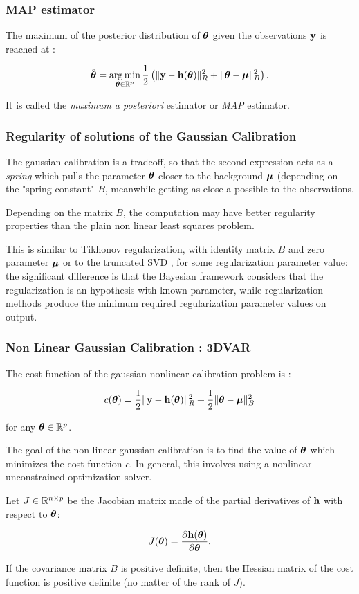 \documentclass{beamer}
\begin{document}
\begin{frame}
\frametitle{MAP estimator}

The maximum of the posterior distribution of $\boldsymbol{\theta}$ given
the observations ${\bf y}$ is reached at :

$$
   \hat{\boldsymbol{\theta}} = \operatorname*{arg\,min}_{\boldsymbol{\theta}\in\mathbb{R}^p} \frac{1}{2} \left( \|{\bf y} - {\bf h}(\boldsymbol{\theta})\|^2_R 
   + \|\boldsymbol{\theta}-\boldsymbol{\mu} \|^2_B \right).
$$

It is called the \emph{maximum a posteriori} estimator or \emph{MAP}
estimator.
\end{frame}

\begin{frame}
\frametitle{Regularity of solutions of the Gaussian Calibration}

The gaussian calibration is a tradeoff, so that the second expression
acts as a \emph{spring} which pulls the parameter $\boldsymbol{\theta}$
closer to the background $\boldsymbol{\mu}$ (depending on the "spring
constant" $B$, meanwhile getting as close a possible to the
observations. 

Depending on the matrix $B$, the computation may
have better regularity properties than the plain non linear least
squares problem.

This is similar to Tikhonov regularization, with identity 
matrix $B$ and zero parameter $\boldsymbol{\mu}$ \cite{mueller2012linear} or to 
the truncated SVD \cite{Hansen00thelcurve}, for some 
regularization parameter value: the significant difference is that the 
Bayesian framework considers that the regularization is an hypothesis with 
known parameter, while regularization methods produce the minimum 
required regularization parameter values on output. 
\end{frame}

\begin{frame}
\frametitle{Non Linear Gaussian Calibration : 3DVAR}

The cost function of the gaussian nonlinear calibration problem is :

$$
c(\boldsymbol{\theta}) = \frac{1}{2}\|{\bf y}-{\bf h}(\boldsymbol{\theta})\|^2_R 
   + \frac{1}{2}\|\boldsymbol{\theta}-\boldsymbol{\mu} \|^2_B
$$

for any $\boldsymbol{\theta}\in\mathbb{R}^p$.

The goal of the non linear gaussian calibration is to find the value of
$\boldsymbol{\theta}$ which minimizes the cost function $c$. In
general, this involves using a nonlinear unconstrained optimization
solver.

Let $J \in \mathbb{R}^{n \times p}$ be the Jacobian matrix made of
the partial derivatives of ${\bf h}$ with respect to
$\boldsymbol{\theta}$:

$$
J(\boldsymbol{\theta}) = \frac{\partial {\bf h} (\boldsymbol{\theta})}{\partial \boldsymbol{\theta}}.
$$

If the covariance matrix $B$ is positive definite, then the
Hessian matrix of the cost function is positive definite 
(no matter of the rank of $J$). 

\end{frame}
\end{document}
